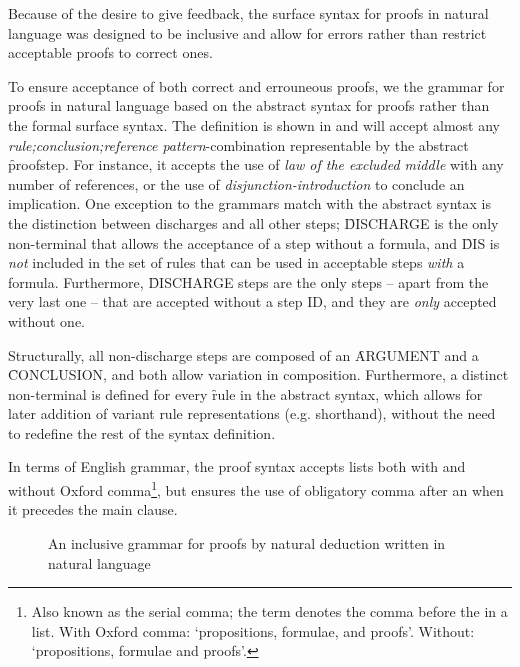 \documentclass[manual.tex]{subfiles}
\begin{document}
Because of the desire to give feedback, the surface syntax for proofs in
natural language was designed to be inclusive and allow for errors rather
than restrict acceptable proofs to correct ones.

To ensure acceptance of both correct and errouneous proofs, we 
  the grammar for proofs in natural language based on the
 abstract syntax for proofs rather than the formal surface syntax.
 The definition is shown in 
 and will accept almost any 
 \emph{rule;conclusion;reference pattern}-combination representable
 by the abstract \f{proofstep}. For instance, it accepts the use
 of \emph{law of the excluded middle} with any number of references, or
 the use of \emph{disjunction-introduction} to conclude an implication.
 One exception to the grammars match with the abstract syntax is
 the distinction between
 discharges and all other steps; \f{DISCHARGE} is the only non-terminal
 that allows the acceptance of a step without a formula, and \f{DIS} is
 \emph{not} included in the set of rules that can be used in acceptable
 steps \emph{with} a formula. Furthermore, \f{DISCHARGE} steps are the only
 steps -- apart from the very last one -- that are accepted without a step
 ID, and they are \emph{only} accepted without one. 
 
 Structurally, all non-discharge steps are composed of an \f{ARGUMENT} and
 a \f{CONCLUSION}, and both allow variation in composition.
 Furthermore, a distinct non-terminal is defined for every 
 \f{rule} in the abstract syntax, which allows for later addition of
 variant rule representations (e.g. shorthand), without the need to
 redefine the rest of the syntax definition.

 In terms of English grammar, the proof syntax accepts lists both with and
 without Oxford comma\footnote{Also known as the serial comma; the term
 denotes the comma before the  in a list. 
 With Oxford comma: `propositions, formulae, and proofs'. 
 Without: `propositions, formulae and proofs'.},
 but ensures the use of obligatory comma after an 
 when it precedes the main clause. 

\begin{figure}[!ht]
\scriptsize

\caption{An inclusive grammar for proofs by natural deduction written in
natural language}
\label{nlproof}
\end{figure}

\end{document}
